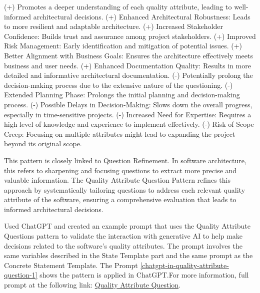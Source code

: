 \newline
\textcolor{mycolorblue}{(+)} Promotes a deeper understanding of each quality attribute, leading to well-informed architectural decisions. \newline
\textcolor{mycolorblue}{(+)} Enhanced Architectural Robustness: Leads to more resilient and adaptable architecture. \newline
\textcolor{mycolorblue}{(+)} Increased Stakeholder Confidence: Builds trust and assurance among project stakeholders. \newline
\textcolor{mycolorblue}{(+)} Improved Risk Management: Early identification and mitigation of potential issues. \newline
\textcolor{mycolorblue}{(+)} Better Alignment with Business Goals: Ensures the architecture effectively meets business and user needs. \newline
\textcolor{mycolorblue}{(+)} Enhanced Documentation Quality: Results in more detailed and informative architectural documentation. \newline
\textcolor{mycolorred}{(-)} Potentially prolong the decision-making process due to the extensive nature of the questioning. \newline
\textcolor{mycolorred}{(-)} Extended Planning Phase: Prolongs the initial planning and decision-making process. \newline
\textcolor{mycolorred}{(-)} Possible Delays in Decision-Making: Slows down the overall progress, especially in time-sensitive projects. \newline
\textcolor{mycolorred}{(-)} Increased Need for Expertise: Requires a high level of knowledge and experience to implement effectively. \newline
\textcolor{mycolorred}{(-)} Risk of Scope Creep: Focusing on multiple attributes might lead to expanding the project beyond its original scope. \newline


 This pattern is closely linked to Question Refinement. In software architecture, this refers to sharpening and focusing questions to extract more precise and valuable information. The Quality Attribute Question Pattern refines this approach by systematically tailoring questions to address each relevant quality attribute of the software, ensuring a comprehensive evaluation that leads to informed architectural decisions.

 Used ChatGPT and created an example prompt that uses the Quality Attribute Questions pattern to validate the interaction with generative AI to help make decisions related to the software's quality attributes. The prompt involves the same variables described in the State Template part and the same prompt as the Concrete Statement Template. The Prompt \ref{chatgpt-in-quality-attribute-question-1} shows the pattern is applied in ChatGPT.For more information, full prompt at the following link: \href{https://chat.openai.com/share/82a67e08-53b6-4b53-b69e-7881954721f2}{Quality Attribute Question}.

